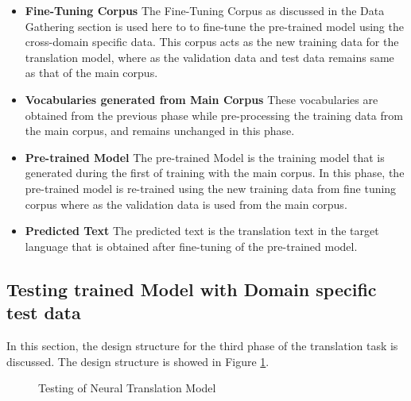 \begin{itemize}
    \item \textbf{Fine-Tuning Corpus} The Fine-Tuning Corpus as discussed in the Data Gathering section is used here to to fine-tune the pre-trained model using the cross-domain specific data. This corpus acts as the new training data for the translation model, where as the validation data and test data remains same as that of the main corpus.
    \item \textbf{Vocabularies generated from Main Corpus} These vocabularies are obtained from the previous phase while pre-processing the training data from the main corpus, and remains unchanged in this phase.
    \item \textbf{Pre-trained Model} The pre-trained Model is the training model that is generated during the first of training with the main corpus. In this phase, the pre-trained model is re-trained using the new training data from fine tuning corpus where as the validation data is used from the main corpus.
    \item \textbf{Predicted Text} The predicted text is the translation text in the target language that is obtained after fine-tuning of the pre-trained model. 
\end{itemize}


\subsection{Testing trained Model with Domain specific test data}
In this section, the design structure for the third phase of the translation task is discussed. The design structure is showed in Figure \ref{seq2seq4}.

\begin{figure}[h]
\caption{Testing of Neural Translation Model} \label{seq2seq4}
\end{figure}

